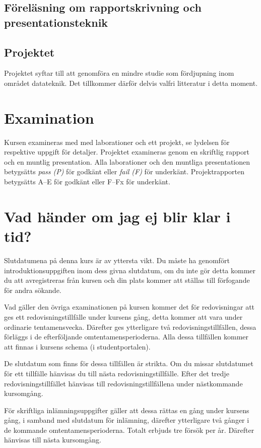 \documentclass[a4paper,logo]{miunart}
\begin{document}
\subsection{Föreläsning om rapportskrivning och presentationsteknik}


\subsection{Projektet}
Projektet syftar till att genomföra en mindre studie som fördjupning inom 
området datateknik.
Det tillkommer därför delvis valfri litteratur i detta moment.


\section{Examination}
\label{sec:exam}
\noindent
Kursen examineras med med laborationer och ett projekt, se lydelsen för 
respektive uppgift för detaljer.
Projektet examineras genom en skriftlig rapport och en muntlig presentation.
Alla laborationer och den muntliga presentationen betygsätts \emph{pass (P)} 
för godkänt eller \emph{fail (F)} för underkänt.
Projektrapporten betygsätts A--E för godkänt eller F--Fx för underkänt.


\section{Vad händer om jag ej blir klar i tid?}
\label{sec:late}
\noindent
Slutdatumena på denna kurs är av yttersta vikt.
Du måste ha genomfört introduktionsuppgiften inom dess givna slutdatum, om du 
inte gör detta kommer du att avregistreras från kursen och din plats kommer att 
ställas till förfogande för andra sökande.

Vad gäller den övriga examinationen på kursen kommer det för redovisningar att 
ges ett redovisningstillfälle under kursens gång, detta kommer att vara under 
ordinarie tentamensvecka.
Därefter ges ytterligare två redovisningstillfällen, dessa förläggs i de 
efterföljande omtentamensperioderna.
Alla dessa tillfällen kommer att finnas i kursens schema (i studentportalen).

De slutdatum som finns för dessa tillfällen är strikta.
Om du missar slutdatumet för ett tillfälle hänvisas du till nästa 
redovisningstillfälle.
Efter det tredje redovisningstillfället hänvisas till redovisningstillfällena 
under nästkommande kursomgång.

För skriftliga inlämningsuppgifter gäller att dessa rättas en gång under 
kursens gång, i samband med slutdatum för inlämning, därefter ytterligare två 
gånger i de kommande omtentamensperioderna.
Totalt erbjuds tre försök per år.
Därefter hänvisas till nästa kursomgång.
\end{document}
